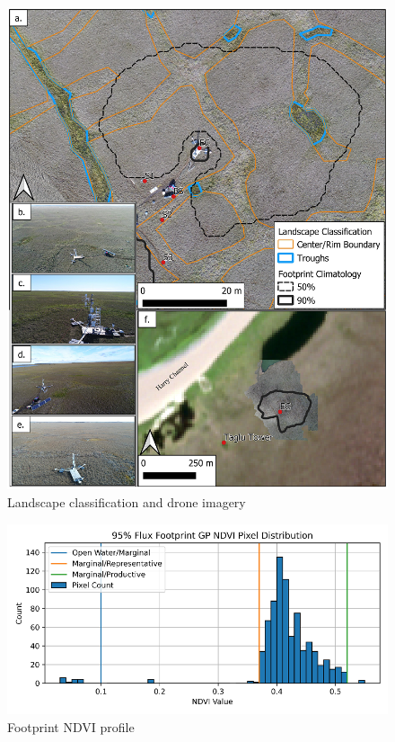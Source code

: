 \documentclass[
]{book}
\begin{document}
\begin{figure}
\centering
\includegraphics{images/16-fig2.png}
\caption{Landscape classification and drone imagery}
\end{figure}

\begin{figure}
\centering
\includegraphics{images/16-fig3.png}
\caption{Footprint NDVI profile}
\end{figure}
\end{document}
